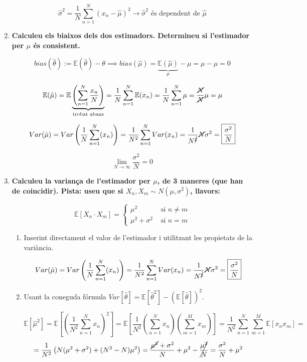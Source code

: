 \documentclass[a4paper]{article}
\begin{document}
\begin{enumerate}
$$ \hat{\sigma}^2 = \frac{1}{N} \sum_{n=1}^N (x_n - \hat{\mu})^2 \rightarrow \hat{\sigma}^2 \text{ és dependent de } \hat{\mu}$$

\item \textbf{Calculeu els biaixos dels dos estimadors. Determineu si l'estimador per $\mu$ és consistent.}

$$ bias(\hat{\theta}) := \mathbb{E}(\hat{\theta}) - \theta \implies bias(\hat{\mu}) = \underbrace{\mathbb{E}(\hat{\mu})}_{\mu} - \mu = \mu - \mu = 0 $$

$$ \mathbb{E}(\hat{\mu}) = \mathbb{E}\underbrace{\left(\sum_{n=1}^N \frac{x_n}{N}\right)}_{\text{trobat abans}} = \frac{1}{N}\sum_{n=1}^N \mathbb{E}(x_n) = \frac{1}{N}\sum_{n=1}^N \mu = \frac{\cancel{N}}{\cancel{N}}\mu = \mu$$

$$ Var(\hat{\mu}) = Var\left(\frac{1}{N} \sum_{n=1}^{N}(x_n)\right) = \frac{1}{N^2} \sum_{n=1}^{N}Var(x_n) = \frac{1}{N^{\cancel{2}}}\cancel{N}\sigma^2 = \boxed{\frac{\sigma^2}{N}}  $$

$$\lim_{N\to\infty} \frac{\sigma^2}{N} = 0$$


\item \textbf{Calculeu la variança de l'estimador per $\mu$, de 3 maneres (que han de coincidir). Pista: useu que si $X_n, X_m \sim N(\mu, \sigma^2)$, llavors:}

$$ \mathbb{E}[X_n · X_m] = 
\begin{cases}
\mu^2 & \text{ si } n \ne m \\
\mu^2 + \sigma^2 & \text{ si } n = m
\end{cases}$$

\begin{enumerate}
    \item Inserint directament el valor de l'estimador i utilitzant les propietats de la variància.
    
    $$ Var(\hat{\mu}) = Var\left(\frac{1}{N} \sum_{n=1}^{N}(x_n)\right) = \frac{1}{N^2} \sum_{n=1}^{N}Var(x_n) = \frac{1}{N^{\cancel{2}}}\cancel{N}\sigma^2 = \boxed{\frac{\sigma^2}{N}}    $$
    
    \item Usant la coneguda fórmula $Var[\hat{\theta}] = \mathbb{E}[\hat{\theta}^2] - (\mathbb{E}[\hat{\theta}])^2$.
    
    $$ \mathbb{E}[\hat{\mu}^2]  = \mathbb{E}\left[\left(\frac{1}{N^2}\sum_{n=1}^{N}x_n\right)^2\right] =
    \mathbb{E}\left[\frac{1}{N^2} \left(\sum_{n=1}^{N}x_n\right)\left(\sum_{m=1}^{M}x_m\right)\right] = \frac{1}{N^2}\sum_{n=1}^{N}\sum_{m=1}^{M}\mathbb{E}[x_n x_m] = $$
    $$ = \frac{1}{N^2}\left(N(\mu^2+\sigma^2)+(N^2-N)\mu^2\right) = \frac{\cancel{\mu^2}+\sigma^2}{N}+\mu^2-\cancel{\frac{\mu^2}{N}} = \frac{\sigma^2}{N}+\mu^2 $$
    

\end{enumerate}
\end{enumerate}
\end{document}
